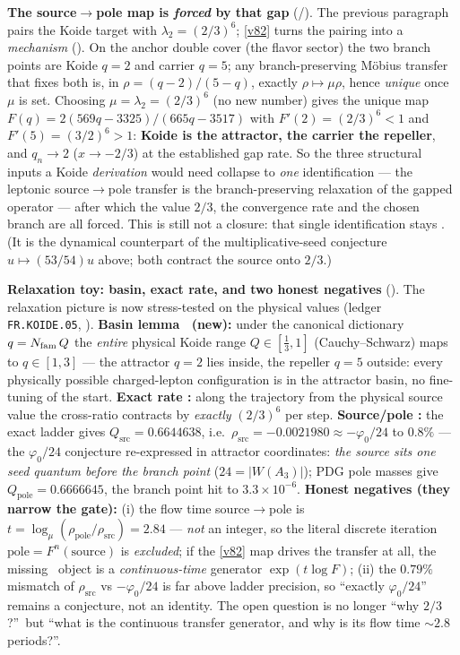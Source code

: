 \par\smallskip\noindent\textbf{The source$\to$pole map is \emph{forced} by that gap} (\mE/\mC).
The previous paragraph pairs the Koide target with $\lambda_2=(2/3)^6$; \vref{v82} turns the
pairing into a \emph{mechanism} (). On the anchor double cover (the flavor sector) the two branch points are Koide $q=2$ and carrier
$q=5$; any branch-preserving M\"obius transfer that fixes both is, in $\rho=(q-2)/(5-q)$, exactly $\rho\mapsto\mu\rho$,
hence \emph{unique} once $\mu$ is set. Choosing $\mu=\lambda_2=(2/3)^6$ (no new number) gives the unique map
$F(q)=2(569q-3325)/(665q-3517)$ with $F'(2)=(2/3)^6<1$ and $F'(5)=(3/2)^6>1$: \textbf{Koide is the attractor, the
carrier the repeller}, and $q_n\to2$ ($x\to-2/3$) at the established gap rate. So the three structural inputs a Koide
\emph{derivation} would need collapse to \emph{one} identification --- the leptonic source$\to$pole transfer is the
branch-preserving relaxation of the gapped operator --- after which the value $2/3$, the convergence rate and the
chosen branch are all forced. This is still not a closure: that single identification stays \mC. (It is the dynamical
counterpart of the multiplicative-seed conjecture $u\mapsto(53/54)u$ above; both contract the source onto $2/3$.)

\par\smallskip\noindent\textbf{Relaxation toy: basin, exact rate, and two honest negatives} (\mE).
The relaxation picture is now stress-tested on the physical values (ledger \texttt{FR.KOIDE.05}, ).
\textbf{Basin lemma \mE\ (new):} under the canonical dictionary $q=N_{\mathrm{fam}}\,Q$ the \emph{entire} physical Koide
range $Q\in[\tfrac13,1]$ (Cauchy--Schwarz) maps to $q\in[1,3]$ --- the attractor $q=2$ lies inside, the
repeller $q=5$ outside: every physically possible charged-lepton configuration is in the attractor basin, no
fine-tuning of the start. \textbf{Exact rate \mE:} along the trajectory from the physical source value the
cross-ratio contracts by \emph{exactly} $(2/3)^6$ per step. \textbf{Source/pole \mE:} the exact ladder
gives $Q_{\mathrm{src}}=0.6644638$, i.e.\ $\rho_{\mathrm{src}}=-0.0021980\approx-\varphi_0/24$ to $0.8\%$ ---
the $\varphi_0/24$ conjecture re-expressed in attractor coordinates: \emph{the source sits one seed quantum
before the branch point} ($24=|W(A_3)|$); PDG pole masses give $Q_{\mathrm{pole}}=0.6666645$, the branch
point hit to $3.3\times10^{-6}$. \textbf{Honest negatives (they narrow the gate):} (i) the flow time
source$\to$pole is $t=\log_\mu(\rho_{\mathrm{pole}}/\rho_{\mathrm{src}})=2.84$ --- \emph{not} an integer, so
the literal discrete iteration $\mathrm{pole}=F^n(\mathrm{source})$ is \emph{excluded}; if the \vref{v82} map drives
the transfer at all, the missing \mC\ object is a \emph{continuous-time} generator $\exp(t\log F)$;
(ii) the $0.79\%$ mismatch of $\rho_{\mathrm{src}}$ vs $-\varphi_0/24$ is far above ladder precision, so
``exactly $\varphi_0/24$'' remains a conjecture, not an identity. The open question is no longer ``why
$2/3$?''\ but ``what is the continuous transfer generator, and why is its flow time $\sim2.8$ periods?''.

